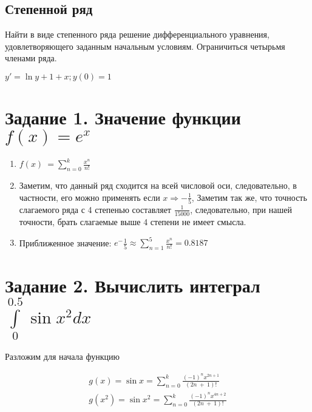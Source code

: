 \documentclass{article}
\renewcommand{\thesubsection}{Задание \arabic{subsection}.}
\begin{document}
\subsection{Степенной ряд}

Найти в виде степенного ряда решение дифференциального уравнения, удовлетворяющего заданным начальным условиям. Ограничиться четырьмя членами ряда. 
\begin{center}
    $y' = \ln{y} + 1 + x; y(0) = 1$
\end{center}

\renewcommand{\thesubsection}{\arabic{subsection}.}


\section{Задание 1. Значение функции $f(x) = e^x$}

\begin{enumerate}
    \item $f\left(x\right)\ =\sum_{n=0}^{k}\frac{x^n}{n!}$
    \item Заметим, что данный ряд сходится на всей числовой оси, следовательно, в частности, его можно применять если $x \Rightarrow -\frac{1}{5}$, Заметим так же, что точность слагаемого ряда с 4 степенью составляет $\frac{1}{15000}$, следовательно, при нашей точности, брать слагаемые выше 4 степени не имеет смысла.
    \item Приближенное значение: $e^-\frac{1}{5} \approx \sum_{n=1}^{5}\frac{x^n}{n!} = 0.8187$
\end{enumerate}




\section{Задание 2. Вычислить интеграл $\int\limits_{0}^{0.5} \sin{x^2}dx$}

Разложим для начала функцию

\begin{align}
    g(x) = \sin{x}
     = \sum_{n=0}^{k}\frac{\left(-1\right)^{n}x^{2n+1}}{\left(2n\ +\ 1\right)!}\\
    g(x^2) = \sin{x^2}
     = \sum_{n=0}^{k}\frac{\left(-1\right)^{n}x^{4n+2}}{\left(2n\ +\ 1\right)!}
\end{align}
    
\end{document}
